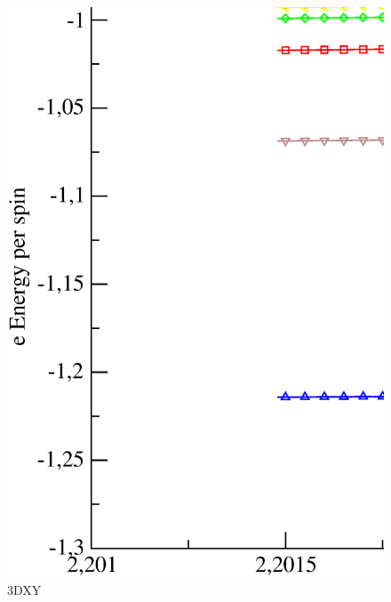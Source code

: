 \begin{figure}[!htpb]
  \centering
  \includegraphics[width=15cm]{./plots/3DXY/3DXY_Energy_vs_Temperature.eps}
  \caption{3DXY}
\end{figure}

